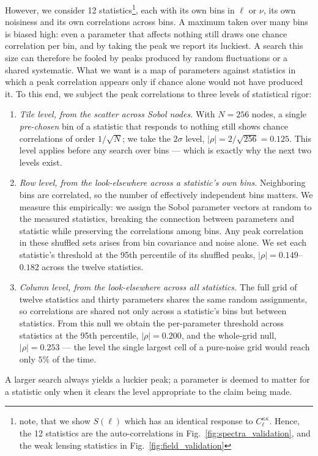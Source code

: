 \documentclass[linenumbers,trackchanges, twocolumn]{aastex701}
\begin{document}
However, we consider 12 statistics\footnote{note, that we show $S(\ell)$ which has an identical response to $C_\ell^{\kappa\kappa}$. Hence, the 12 statistics are the auto-correlations in Fig.~\ref{fig:spectra_validation}, and the weak lensing statistics in Fig.~\ref{fig:field_validation}}, each with its own bins in $\ell$ or $\nu$, its own noisiness and its own correlations across bins. A maximum taken over many bins is biased high: even a parameter that affects nothing still draws one chance correlation per bin, and by taking the peak we report its luckiest. A search this size can therefore be fooled by peaks produced by random fluctuations or a shared systematic. What we want is a map of parameters against statistics in which a peak correlation appears only if chance alone would not have produced it. To this end, we subject the peak correlations to three levels of statistical rigor:
\begin{enumerate}
\item \textit{Tile level, from the scatter across Sobol nodes.} With $N=256$ nodes, a single \emph{pre-chosen} bin of a statistic that responds to nothing still shows chance correlations of order $1/\sqrt{N}$; we take the $2\sigma$ level, $|\rho| = 2/\sqrt{256} = 0.125$. This level applies before any search over bins --- which is exactly why the next two levels exist. %
\item \textit{Row level, from the look-elsewhere across a statistic's own bins.} Neighboring bins are correlated, so the number of effectively independent bins matters. We measure this empirically: we assign the Sobol parameter vectors at random to the measured statistics, breaking the connection between parameters and statistic while preserving the correlations among bins. Any peak correlation in these shuffled sets arises from bin covariance and noise alone. We set each statistic's threshold at the 95th percentile of its shuffled peaks, $|\rho| = 0.149$--$0.182$ across the twelve statistics.
\item \textit{Column level, from the look-elsewhere across all statistics.} The full grid of twelve statistics and thirty parameters shares the same random assignments, so correlations are shared not only across a statistic's bins but between statistics. From this null we obtain the per-parameter threshold across statistics at the 95th percentile, $|\rho| = 0.200$, and the whole-grid null, $|\rho| = 0.253$ --- the level the single largest cell of a pure-noise grid would reach only $5\%$ of the time.
\end{enumerate}
A larger search always yields a luckier peak; a parameter is deemed to matter for a statistic only when it clears the level appropriate to the claim being made.
 
\end{document}
